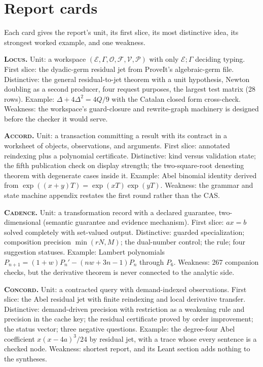 \documentclass[11pt,a4paper]{article}
\newcommand{\code}[1]{\texttt{\detokenize{#1}}}
\newcommand{\Lc}{\textsc{Locus}}
\newcommand{\Ac}{\textsc{Accord}}
\newcommand{\Cd}{\textsc{Cadence}}
\newcommand{\Cc}{\textsc{Concord}}
\theoremstyle{definition}
\begin{document}
\appendix

\section{Report cards}\label{app:cards}
Each card gives the report's unit, its first slice, its most distinctive idea, its strongest worked example, and one weakness.

\textbf{\Lc.} Unit: a workspace $(\mathcal E,\Gamma,\mathcal O,\mathcal F,\mathcal V,\mathcal P)$ with only $\mathcal E;\Gamma$ deciding typing. First slice: the dyadic-germ residual jet from ProveIt's algebraic-germ file. Distinctive: the general residual-to-jet theorem with a unit hypothesis, Newton doubling as a second producer, four request purposes, the largest test matrix (28 rows). Example: $\Delta+4\Delta^2=4Q/9$ with the Catalan closed form cross-check. Weakness: the workspace's guard-closure and rewrite-graph machinery is designed before the checker it would serve.

\textbf{\Ac.} Unit: a transaction committing a result with its contract in a worksheet of objects, observations, and arguments. First slice: annotated reindexing plus a polynomial certificate. Distinctive: kind versus validation state; the fifth publication check on display strength; the two-square-root denesting theorem with degenerate cases inside it. Example: Abel binomial identity derived from $\exp((x+y)T)=\exp(xT)\exp(yT)$. Weakness: the grammar and state machine appendix restates the first round rather than the CAS.

\textbf{\Cd.} Unit: a transformation record with a declared guarantee, two-dimensional (semantic guarantee and evidence mechanism). First slice: $ax=b$ solved completely with set-valued output. Distinctive: guarded specialization; composition precision $\min(rN,M)$; the dual-number control; the \code{polyrith} rule; four suggestion statuses. Example: Lambert polynomials $P_{n+1}=(1+w)P_n'-(nw+3n-1)P_n$ through $P_6$. Weakness: 267 companion checks, but the derivative theorem is never connected to the analytic side.

\textbf{\Cc.} Unit: a contracted query with demand-indexed observations. First slice: the Abel residual jet with finite reindexing and local derivative transfer. Distinctive: demand-driven precision with restriction as a weakening rule and precision in the cache key; the residual certificate proved by order improvement; the status vector; three negative questions. Example: the degree-four Abel coefficient $x(x-4a)^3/24$ by residual jet, with a trace whose every sentence is a checked node. Weakness: shortest report, and its Leant section adds nothing to the syntheses.
\end{document}
